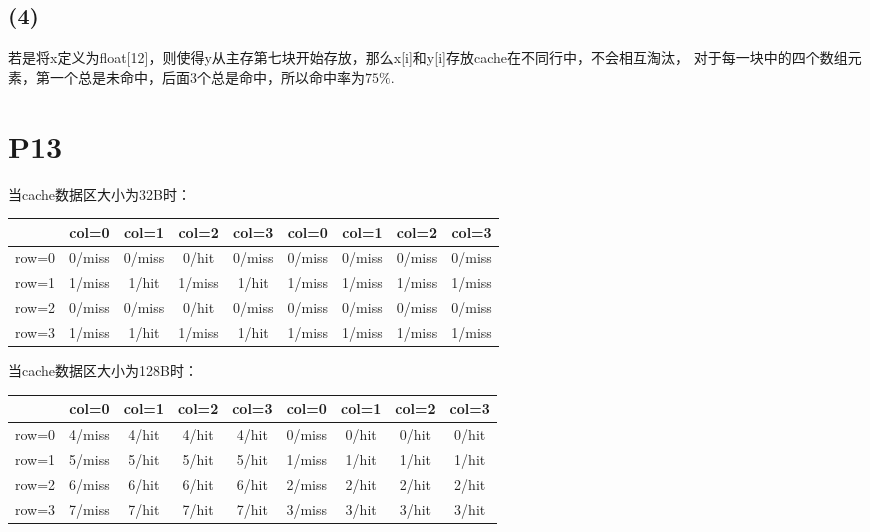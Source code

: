 \documentclass{article}
\begin{document}
\subsection*{(4)}
若是将x定义为float[12]，则使得y从主存第七块开始存放，那么x[i]和y[i]存放cache在不同行中，不会相互淘汰，
对于每一块中的四个数组元素，第一个总是未命中，后面3个总是命中，所以命中率为$75\%$.
\section{P13}
当cache数据区大小为32B时：
\begin{table}[h]
	\begin{center} %
	  \begin{tabular}{c|c|c|c|c|c|c|c|c} %
		\hline
		\textbf{} & \textbf{col=0} & \textbf{col=1} & \textbf{col=2} & \textbf{col=3} &\textbf{col=0} & \textbf{col=1} & \textbf{col=2} & \textbf{col=3}\\
		\hline
		row=0 & 0/miss & 0/miss & 0/hit & 0/miss & 0/miss & 0/miss & 0/miss & 0/miss \\
		\hline
		row=1 & 1/miss & 1/hit & 1/miss & 1/hit & 1/miss & 1/miss & 1/miss & 1/miss \\
		\hline
		row=2 & 0/miss & 0/miss & 0/hit & 0/miss & 0/miss & 0/miss & 0/miss & 0/miss \\
		\hline
		row=3 & 1/miss & 1/hit & 1/miss & 1/hit & 1/miss & 1/miss & 1/miss & 1/miss \\
		\hline
	\end{tabular}
	\end{center}
\end{table}

当cache数据区大小为128B时：
\begin{table}[h]
	\begin{center} %
	  \begin{tabular}{c|c|c|c|c|c|c|c|c} %
		\hline
		\textbf{} & \textbf{col=0} & \textbf{col=1} & \textbf{col=2} & \textbf{col=3} &\textbf{col=0} & \textbf{col=1} & \textbf{col=2} & \textbf{col=3}\\
		\hline
		row=0 & 4/miss & 4/hit & 4/hit & 4/hit & 0/miss & 0/hit & 0/hit & 0/hit \\
		\hline
		row=1 & 5/miss & 5/hit & 5/hit & 5/hit & 1/miss & 1/hit & 1/hit & 1/hit \\
		\hline
		row=2 & 6/miss & 6/hit & 6/hit & 6/hit & 2/miss & 2/hit & 2/hit & 2/hit \\
		\hline
		row=3 & 7/miss & 7/hit & 7/hit & 7/hit & 3/miss & 3/hit & 3/hit & 3/hit \\
		\hline
	\end{tabular}
	\end{center}
\end{table}
\end{document}
